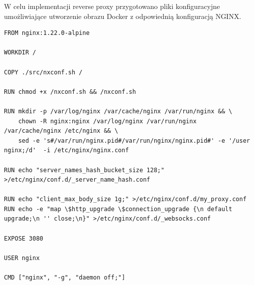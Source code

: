 \documentclass{article}
\begin{document}
W celu implementacji reverse proxy przygotowano pliki konfiguracyjne umożliwiające utworzenie obrazu Docker z odpowiednią konfiguracją NGINX.

\begin{lstlisting}[caption=Plik \lstinline|/infrastructure/reverse-proxy/Dockerfile|]
FROM nginx:1.22.0-alpine

WORKDIR /

COPY ./src/nxconf.sh /

RUN chmod +x /nxconf.sh && /nxconf.sh

RUN mkdir -p /var/log/nginx /var/cache/nginx /var/run/nginx && \
    chown -R nginx:nginx /var/log/nginx /var/run/nginx /var/cache/nginx /etc/nginx && \
    sed -e 's#/var/run/nginx.pid#/var/run/nginx/nginx.pid#' -e '/user  nginx;/d'  -i /etc/nginx/nginx.conf

RUN echo "server_names_hash_bucket_size 128;" >/etc/nginx/conf.d/_server_name_hash.conf

RUN echo "client_max_body_size 1g;" >/etc/nginx/conf.d/my_proxy.conf
RUN echo -e "map \$http_upgrade \$connection_upgrade {\n default upgrade;\n '' close;\n}" >/etc/nginx/conf.d/_websocks.conf

EXPOSE 3080

USER nginx

CMD ["nginx", "-g", "daemon off;"]
\end{lstlisting}
\end{document}
